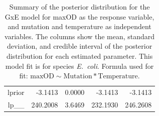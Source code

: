 \begin{table}[ht]
\begin{tabular}{rrrrr}
  lprior & -3.1413 & 0.0000 & -3.1413 & -3.1413 \\ 
  lp\_\_ & 240.2008 & 3.6469 & 232.1930 & 246.2608 \\ 
   \hline
\end{tabular}
\caption{Summary of the posterior distribution for the GxE model for maxOD as the response variable, and mutation and temperature as independent variables. The columns show the mean, standard deviation, and credible interval of the posterior distribution for each estimated parameter. This model fit is for species \textit{E.~coli}.  Formula used for fit: $\text{maxOD} \sim \text{Mutation} * \text{Temperature}$.} 
\label{supptab:GxE_maxOD_Ecoli}
\end{table}



